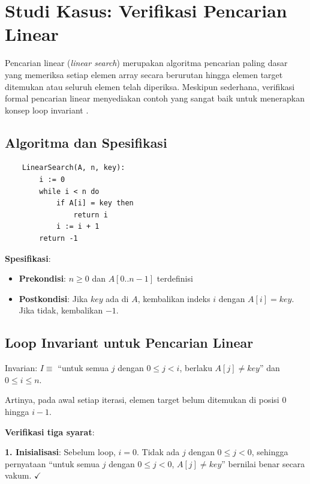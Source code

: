\section{Studi Kasus: Verifikasi Pencarian Linear}

Pencarian linear (\textit{linear search}) merupakan algoritma pencarian paling dasar yang memeriksa setiap elemen array secara berurutan hingga elemen target ditemukan atau seluruh elemen telah diperiksa. Meskipun sederhana, verifikasi formal pencarian linear menyediakan contoh yang sangat baik untuk menerapkan konsep loop invariant \cite{rosen2019}.

\subsection{Algoritma dan Spesifikasi}

\begin{verbatim}
    LinearSearch(A, n, key):
        i := 0
        while i < n do
            if A[i] = key then
                return i
            i := i + 1
        return -1
\end{verbatim}

\textbf{Spesifikasi}:
\begin{itemize}
    \item \textbf{Prekondisi}: $n \geq 0$ dan $A[0..n-1]$ terdefinisi
    \item \textbf{Postkondisi}: Jika $key$ ada di $A$, kembalikan indeks $i$ dengan $A[i] = key$. Jika tidak, kembalikan $-1$.
\end{itemize}

\subsection{Loop Invariant untuk Pencarian Linear}

\begin{definisi}
Invarian: $I \equiv$ ``untuk semua $j$ dengan $0 \leq j < i$, berlaku $A[j] \neq key$'' dan $0 \leq i \leq n$.

Artinya, pada awal setiap iterasi, elemen target belum ditemukan di posisi $0$ hingga $i-1$.
\end{definisi}

\textbf{Verifikasi tiga syarat}:

\textbf{1. Inisialisasi}: Sebelum loop, $i = 0$. Tidak ada $j$ dengan $0 \leq j < 0$, sehingga pernyataan ``untuk semua $j$ dengan $0 \leq j < 0$, $A[j] \neq key$'' bernilai benar secara vakum. $\checkmark$

